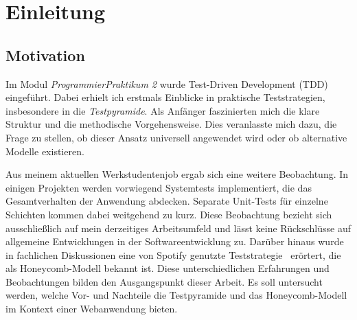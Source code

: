 %
%

\section{Einleitung}

\subsection{Motivation}
Im Modul \emph{ProgrammierPraktikum 2} wurde Test-Driven Development (TDD) eingeführt. Dabei erhielt ich erstmals Einblicke in praktische Teststrategien, insbesondere in die \emph{Testpyramide}. Als Anfänger faszinierten mich die klare Struktur und die methodische Vorgehensweise. Dies veranlasste mich dazu, die Frage zu stellen, ob dieser Ansatz universell angewendet wird oder ob alternative Modelle existieren.

Aus meinem aktuellen Werkstudentenjob ergab sich eine weitere Beobachtung. In einigen Projekten werden vorwiegend Systemtests implementiert, die das Gesamtverhalten der Anwendung abdecken. Separate Unit-Tests für einzelne Schichten kommen dabei weitgehend zu kurz. Diese Beobachtung bezieht sich ausschließlich auf mein derzeitiges Arbeitsumfeld und lässt keine Rückschlüsse auf allgemeine Entwicklungen in der Softwareentwicklung zu.
Darüber hinaus wurde in fachlichen Diskussionen eine von Spotify genutzte Teststrategie~\cite{Spotify18} erörtert, die als Honeycomb-Modell bekannt ist. Diese unterschiedlichen Erfahrungen und Beobachtungen bilden den Ausgangspunkt dieser Arbeit. Es soll untersucht werden, welche Vor- und Nachteile die Testpyramide und das Honeycomb-Modell im Kontext einer Webanwendung bieten.


